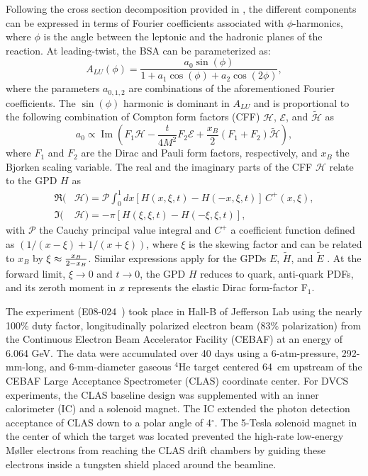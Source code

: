 \documentclass[twocolumn,nofootinbib,prl,superscriptaddress,secnumarabic,amssymb,nobibnotes,aps,floatfix]{revtex4}
\begin{document}
Following the cross section decomposition provided in \cite{Belitsky:2001ns}, 
the different components can be expressed in terms of Fourier coefficients 
associated with $\phi$-harmonics, where $\phi$ is the angle between the 
leptonic and the hadronic planes of the reaction. At leading-twist, the BSA can 
be parameterized as: 
\begin{equation}
   A_{LU}(\phi) = \frac{a_{0}\sin(\phi)}{1+a_{1}\cos(\phi)+a_{2}\cos(2\phi)},
   \label{eq:alu-simp}
\end{equation}
where the parameters $a_{0,1,2}$ are combinations of the aforementioned Fourier 
coefficients. The $\sin(\phi)$ harmonic is dominant in $A_{LU}$ and is 
proportional to the following combination of Compton form factors (CFF) 
$\mathcal{H}$, $\mathcal{E}$, and $\tilde{\mathcal{H}}$ as  
\cite{Guidal:2013rya}
\begin{equation}
   a_{0} \propto \operatorname{Im}( F_1 \mathcal{H}- \frac{t}{4M^2} F_2 
   \mathcal{E}+ \frac{x_B}{2}(F_1+F_2)\tilde{\mathcal{H}}),
   \label{a0_cff}
\end{equation}
where $F_1$ and $F_2$ are the Dirac and Pauli form factors, respectively, and 
$x_B$ the Bjorken scaling variable. The real and the imaginary parts of the CFF 
$\mathcal{H}$ relate to the GPD $H$ as  \begin{align}
   \Re(&\mathcal{H}) = \mathcal{P} \int_{0}^{1}dx[H(x,\xi,t)-H(-x,\xi,t)] \, 
   C^{+}(x,\xi), \\
   \Im(&\mathcal{H}) = - \pi [H(\xi,\xi,t)-H(-\xi,\xi,t)],
\end{align}
with $\mathcal{P}$ the Cauchy principal value integral and $C^{+}$ a 
coefficient function defined as $(1/(x-\xi) + 1/(x+\xi))$, where $\xi$ is the 
skewing factor and can be related to $x_B$ by $\xi\approx {{x_B}\over{2-x_B}}$.  
Similar expressions apply for the GPDs $E$, $\widetilde{H}$, and 
$\widetilde{E}$ \cite{Guidal:2013rya}. At the forward limit, $\xi\to 0$ and $t \to 0$, the GPD $H$ reduces to quark, anti-quark PDFs, and its zeroth moment in $x$ represents the elastic Dirac form-factor F$_1$.



The experiment (E08-024~\cite{Hafidi:2008pr}) took place in Hall-B of Jefferson 
Lab using the nearly 100\% duty factor, longitudinally polarized electron beam 
(83$\%$ polarization) from the Continuous Electron Beam Accelerator Facility 
(CEBAF) at an energy of 6.064 GeV. The data were accumulated over 40 days using 
a 6-atm-pressure, 292-mm-long, and 6-mm-diameter gaseous $^4$He target centered 
64~cm upstream of the CEBAF Large Acceptance Spectrometer (CLAS) coordinate 
center. For DVCS experiments, the CLAS baseline design \cite{Mecking:2003zu} 
was supplemented with an inner calorimeter (IC) and a solenoid magnet. The IC 
extended the photon detection acceptance of CLAS down to a polar angle of 
4$^{\circ}$. The 5-Tesla solenoid magnet in the center of which the target was 
located prevented the high-rate low-energy M{\o}ller electrons from reaching 
the CLAS drift chambers by guiding these electrons inside a tungsten shield 
placed around the beamline. 
\end{document}
